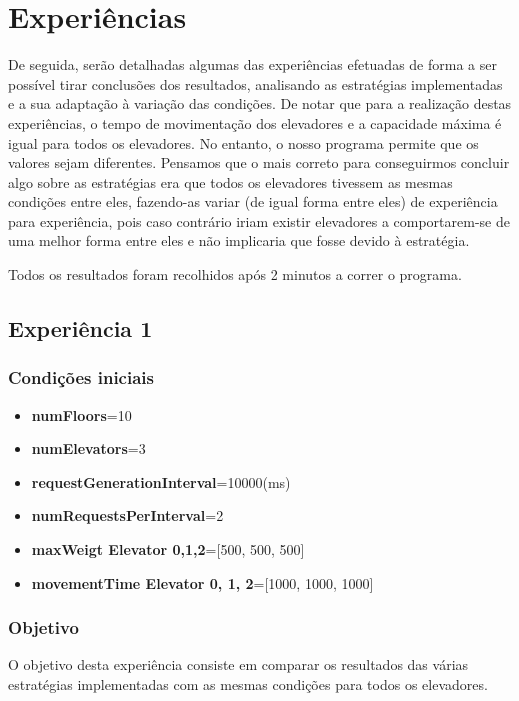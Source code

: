 \documentclass[a4paper]{article}
\begin{document}
\newpage

\section{Experiências}

De seguida, serão detalhadas algumas das experiências efetuadas de forma a ser possível tirar conclusões dos resultados, analisando as estratégias implementadas e a sua adaptação à variação das condições. De notar que para a realização destas experiências, o tempo de movimentação dos elevadores e a capacidade máxima é igual para todos os elevadores. No entanto, o nosso programa permite que os valores sejam diferentes. Pensamos que o mais correto para conseguirmos concluir algo sobre as estratégias era que todos os elevadores tivessem as mesmas condições entre eles, fazendo-as variar (de igual forma entre eles) de experiência para experiência, pois caso contrário iriam existir elevadores a comportarem-se de uma melhor forma entre eles e não implicaria que fosse devido à estratégia.

Todos os resultados foram recolhidos após 2 minutos a correr o programa.

\subsection{Experiência 1}

\subsubsection{Condições iniciais}

\begin{itemize}
\item \textbf{numFloors}=10
\item \textbf{numElevators}=3
\item \textbf{requestGenerationInterval}=10000(ms)
\item \textbf{numRequestsPerInterval}=2
\item \textbf{maxWeigt Elevator 0,1,2}=[500, 500, 500]
\item \textbf{movementTime Elevator 0, 1, 2}=[1000, 1000, 1000]
\end{itemize}

\subsubsection{Objetivo} 

O objetivo desta experiência consiste em comparar os resultados das várias estratégias implementadas com as mesmas condições para todos os elevadores.
\end{document}
